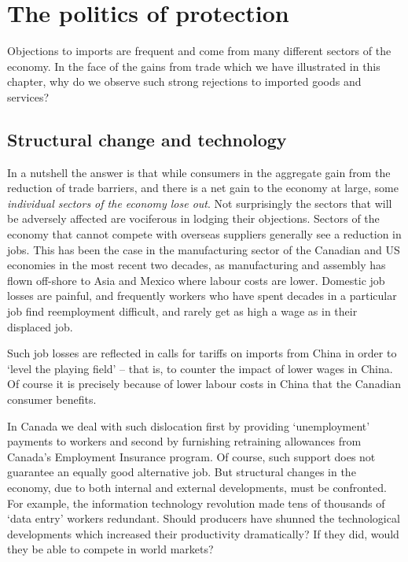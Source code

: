 \section{The politics of protection}\label{sec:ch15sec6}

Objections to imports are frequent and come from many different sectors of the economy. In the face of the gains from trade which we have illustrated in this chapter, why do we observe such strong rejections to imported goods and services?

\subsection*{Structural change and technology}

In a nutshell the answer is that while consumers in the aggregate gain from the reduction of trade barriers, and there is a net gain to the economy at large, some \textit{individual sectors of the economy lose out}. Not surprisingly the sectors that will be adversely affected are vociferous in lodging their objections. Sectors of the economy that cannot compete with overseas suppliers generally see a reduction in jobs. This has been the case in the manufacturing sector of the Canadian and US economies in the most recent two decades, as manufacturing and assembly has flown off-shore to Asia and Mexico where labour costs are lower. Domestic job losses are painful, and frequently workers who have spent decades in a particular job find reemployment difficult, and rarely get as high a wage as in their displaced job.

Such job losses are reflected in calls for tariffs on imports from China in order to `level the playing field' -- that is, to counter the impact of lower wages in China. Of course it is precisely because of lower labour costs in China that the Canadian consumer benefits. 

In Canada we deal with such dislocation first by providing `unemployment' payments to workers and second by furnishing retraining allowances from Canada's Employment Insurance program. Of course, such support does not guarantee an equally good alternative job. But structural changes in the economy, due to both internal and external developments, must be confronted. For example, the information technology revolution made tens of thousands of `data entry' workers redundant. Should producers have shunned the technological developments which increased their productivity dramatically? If they did, would they be able to compete in world markets?

